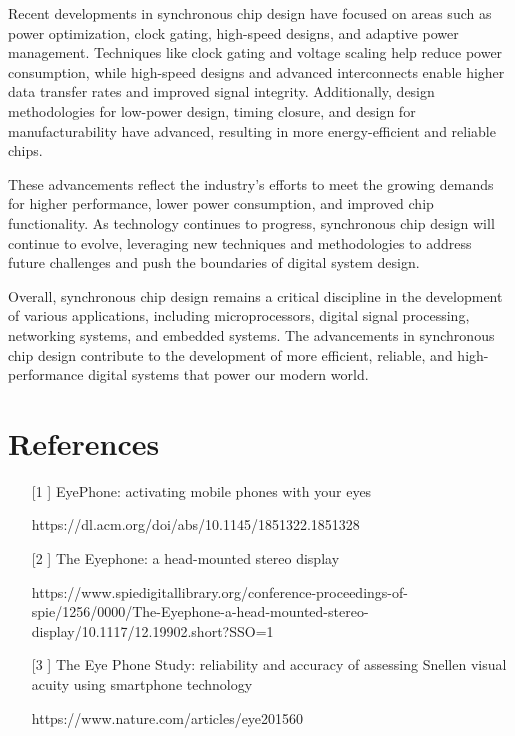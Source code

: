 \documentclass[a4paper,11pt]{report}
\begin{document}
Recent developments in synchronous chip design have focused on areas such as power optimization, clock gating, high-speed designs, and adaptive power management. Techniques like clock gating and voltage scaling help reduce power consumption, while high-speed designs and advanced interconnects enable higher data transfer rates and improved signal integrity. Additionally, design methodologies for low-power design, timing closure, and design for manufacturability have advanced, resulting in more energy-efficient and reliable chips.

These advancements reflect the industry's efforts to meet the growing demands for higher performance, lower power consumption, and improved chip functionality. As technology continues to progress, synchronous chip design will continue to evolve, leveraging new techniques and methodologies to address future challenges and push the boundaries of digital system design.

Overall, synchronous chip design remains a critical discipline in the development of various applications, including microprocessors, digital signal processing, networking systems, and embedded systems. The advancements in synchronous chip design contribute to the development of more efficient, reliable, and high-performance digital systems that power our modern world.

\chapter{References}

\begin{itemize}
\item[[1]] EyePhone: activating mobile phones with your eyes

https://dl.acm.org/doi/abs/10.1145/1851322.1851328

\item[[2]] The Eyephone: a head-mounted stereo display

https://www.spiedigitallibrary.org/conference-proceedings-of-spie/1256/0000/The-Eyephone-a-head-mounted-stereo-display/10.1117/12.19902.short?SSO=1

\item[[3]] The Eye Phone Study: reliability and accuracy of assessing Snellen visual acuity using smartphone technology

https://www.nature.com/articles/eye201560

\vspace{12pt}
\end{itemize}
\end{document}

